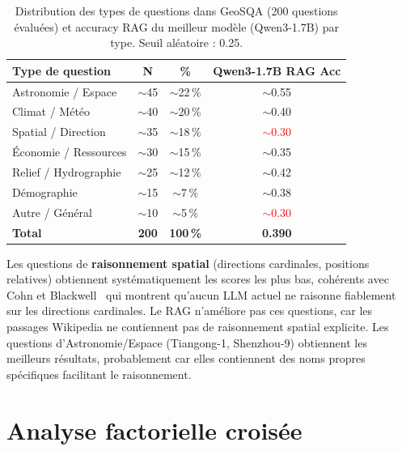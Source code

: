 \documentclass[12pt,a4paper]{article}
\begin{document}
\begin{table}[H]
\centering
\caption{Distribution des types de questions dans GeoSQA (200 questions \'evalu\'ees)
  et accuracy RAG du meilleur mod\`ele (Qwen3-1.7B) par type. Seuil al\'eatoire : 0.25.}
\label{tab:question_types_geosqa}
\begin{tabular}{@{} l c c c @{}}
\toprule
\textbf{Type de question} & \textbf{N} & \textbf{\%}
  & \textbf{Qwen3-1.7B RAG Acc} \\
\midrule
Astronomie / Espace      & $\sim$45 & $\sim$22\,\%
  & \textcolor{green!60!black}{$\sim$0.55} \\
\rowcolor{lightgray}
Climat / M\'et\'eo       & $\sim$40 & $\sim$20\,\% & $\sim$0.40 \\
Spatial / Direction      & $\sim$35 & $\sim$18\,\%
  & \textcolor{red}{$\sim$0.30} \\
\rowcolor{lightgray}
\'Economie / Ressources  & $\sim$30 & $\sim$15\,\% & $\sim$0.35 \\
Relief / Hydrographie    & $\sim$25 & $\sim$12\,\% & $\sim$0.42 \\
\rowcolor{lightgray}
D\'emographie            & $\sim$15 & $\sim$7\,\%  & $\sim$0.38 \\
Autre / G\'en\'eral      & $\sim$10 & $\sim$5\,\%
  & \textcolor{red}{$\sim$0.30} \\
\midrule
\textbf{Total}           & \textbf{200} & \textbf{100\,\%} & \textbf{0.390} \\
\bottomrule
\end{tabular}
\end{table}

Les questions de \textbf{raisonnement spatial} (directions cardinales, positions relatives)
obtiennent syst\'ematiquement les scores les plus bas, coh\'erents avec Cohn et
Blackwell~\cite{cohn_evaluating_2024} qui montrent qu'aucun LLM actuel ne raisonne
fiablement sur les directions cardinales. Le RAG n'am\'eliore pas ces questions, car les
passages Wikipedia ne contiennent pas de raisonnement spatial explicite. Les questions
d'Astronomie/Espace (Tiangong-1, Shenzhou-9) obtiennent les meilleurs r\'esultats,
probablement car elles contiennent des noms propres sp\'ecifiques facilitant le raisonnement.

\section{Analyse factorielle crois\'ee}
\label{sec:analyse}
\end{document}

